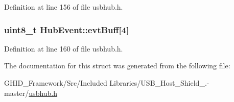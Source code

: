 \-Definition at line 156 of file usbhub.\-h.

\hypertarget{struct_hub_event_a5a8016b368bc8ac993abae3f97b8306f}{
\subsubsection[{evt\-Buff}]{\setlength{\rightskip}{0pt plus 5cm}uint8\-\_\-t {\bf \-Hub\-Event\-::evt\-Buff}\mbox{[}4\mbox{]}}}\label{struct_hub_event_a5a8016b368bc8ac993abae3f97b8306f}


\-Definition at line 160 of file usbhub.\-h.



\-The documentation for this struct was generated from the following file\-:\begin{DoxyCompactItemize}
\item 
\-G\-H\-I\-D\-\_\-\-Framework/\-Src/\-Included Libraries/\-U\-S\-B\-\_\-\-Host\-\_\-\-Shield\-\_.-\/master/\hyperlink{usbhub_8h}{usbhub.\-h}\end{DoxyCompactItemize}
